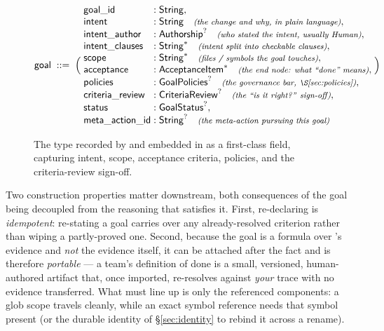 \begin{figure}[H]
\centering
\small
\[
\id{goal} \;::=\; \Big(\;
\begin{array}{@{}l@{\;:\;}l@{}}
\id{goal\_id}        & \id{String},\\
\id{intent}          & \id{String} \quad\text{\footnotesize\itshape (the change and why, in plain language)},\\
\id{intent\_author}  & \opt{\id{Authorship}} \quad\text{\footnotesize\itshape (who stated the intent, usually Human)},\\
\id{intent\_clauses} & \many{\id{String}} \quad\text{\footnotesize\itshape (intent split into checkable clauses)},\\
\id{scope}           & \many{\id{String}} \quad\text{\footnotesize\itshape (files / symbols the goal touches)},\\
\id{acceptance}      & \many{\id{AcceptanceItem}} \quad\text{\footnotesize\itshape (the end node: what ``done'' means)},\\
\id{policies}        & \opt{\id{GoalPolicies}} \quad\text{\footnotesize\itshape (the governance bar, \S\ref{sec:policies})},\\
\id{criteria\_review} & \opt{\id{CriteriaReview}} \quad\text{\footnotesize\itshape (the ``is it right?'' sign-off)},\\
\id{status}          & \opt{\id{GoalStatus}},\\
\id{meta\_action\_id} & \opt{\id{String}} \quad\text{\footnotesize\itshape (the meta-action pursuing this goal)}
\end{array}
\;\Big)
\]
\caption{The  type recorded by  and embedded in \trace{} as a first-class field, capturing intent, scope, acceptance criteria, policies, and the criteria-review sign-off.}
\label{fig:goal-goal-type}
\end{figure}

Two construction properties matter downstream, both consequences of the goal being decoupled from the
reasoning that satisfies it. First, re-declaring is \emph{idempotent}: re-stating a goal carries over
any already-resolved criterion rather than wiping a partly-proved one. Second, because the goal is a
formula over \trace{}'s evidence and \emph{not} the evidence itself, it can be attached after the fact
and is therefore \emph{portable} --- a team's definition of done is a small, versioned, human-authored
artifact that, once imported, re-resolves against \emph{your} trace with no evidence transferred. What
must line up is only the referenced components: a glob scope travels cleanly, while an exact symbol
reference needs that symbol present (or the durable identity of \S\ref{sec:identity} to rebind it
across a rename).


